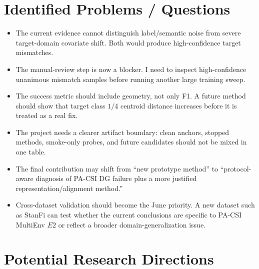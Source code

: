 \documentclass[11pt]{article}
\begin{document}
\section{Identified Problems / Questions}

\begin{itemize}[leftmargin=*]
    \item The current evidence cannot distinguish label/semantic noise from severe target-domain covariate shift. Both would produce high-confidence target mismatches.
    \item The manual-review step is now a blocker. I need to inspect high-confidence unanimous mismatch samples before running another large training sweep.
    \item The success metric should include geometry, not only F1. A future method should show that target class $1/4$ centroid distance increases before it is treated as a real fix.
    \item The project needs a clearer artifact boundary: clean anchors, stopped methods, smoke-only probes, and future candidates should not be mixed in one table.
    \item The final contribution may shift from ``new prototype method'' to ``protocol-aware diagnosis of PA-CSI DG failure plus a more justified representation/alignment method.''
    \item Cross-dataset validation should become the June priority. A new dataset such as StanFi can test whether the current conclusions are specific to PA-CSI MultiEnv $E2$ or reflect a broader domain-generalization issue.
\end{itemize}

\section{Potential Research Directions}
\end{document}

